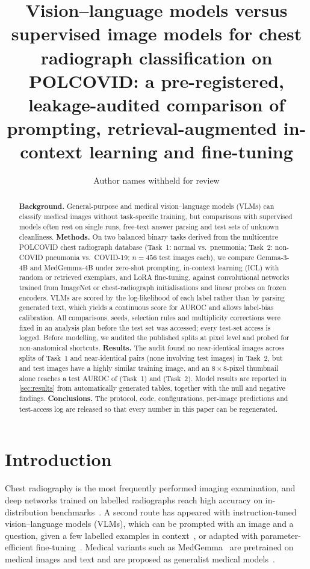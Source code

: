 \documentclass[11pt]{article}
\title{Vision--language models versus supervised image models for chest radiograph
classification on POLCOVID: a pre-registered, leakage-audited comparison of prompting,
retrieval-augmented in-context learning and fine-tuning}
\author{Author names withheld for review}
\date{}
\begin{document}
\maketitle

\begin{abstract}
\noindent\textbf{Background.} General-purpose and medical vision--language models (VLMs) can
classify medical images without task-specific training, but comparisons with supervised models
often rest on single runs, free-text answer parsing and test sets of unknown cleanliness.
\textbf{Methods.} On two balanced binary tasks derived from the multicentre POLCOVID chest
radiograph database (Task~1: normal vs.\ pneumonia; Task~2: non-COVID pneumonia vs.\ COVID-19;
$n=456$ test images each), we compare Gemma-3-4B and MedGemma-4B under zero-shot prompting,
in-context learning (ICL) with random or retrieved exemplars, and LoRA fine-tuning, against
convolutional networks trained from ImageNet or chest-radiograph initialisations and linear
probes on frozen encoders. VLMs are scored by the log-likelihood of each label rather than by
parsing generated text, which yields a continuous score for AUROC and allows label-bias
calibration. All comparisons, seeds, selection rules and multiplicity corrections were fixed
in an analysis plan before the test set was accessed; every test-set access is logged.
Before modelling, we audited the published splits at pixel level and probed for non-anatomical
shortcuts.
\textbf{Results.} The audit found no near-identical images across splits of Task~1 and
\AuditTwoNearIdentical{} near-identical pairs (none involving test images) in Task~2, but
\AuditOneSimilarTest{} and \AuditTwoSimilarTest{} test images have a highly similar training
image, and an $8\times8$-pixel thumbnail alone reaches a test AUROC of \ProbeOneThumbTest{}
(Task~1) and \ProbeTwoThumbTest{} (Task~2). Model results are reported in
\cref{sec:results} from automatically generated tables, together with the null and negative
findings.
\textbf{Conclusions.} The protocol, code, configurations, per-image predictions and test-access
log are released so that every number in this paper can be regenerated.
\end{abstract}

\section{Introduction}

Chest radiography is the most frequently performed imaging examination, and deep networks
trained on labelled radiographs reach high accuracy on in-distribution
benchmarks~\citep{rajpurkar2017chexnet,irvin2019chexpert}. A second route has appeared with
instruction-tuned vision--language models (VLMs), which can be prompted with an image and a
question, given a few labelled examples in context~\citep{brown2020language}, or adapted with
parameter-efficient fine-tuning~\citep{hu2022lora}. Medical variants such as
MedGemma~\citep{sellergren2025medgemma} are pretrained on medical images and text and are
proposed as generalist medical models~\citep{moor2023foundation}.
\end{document}
